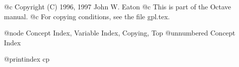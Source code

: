 @c Copyright (C) 1996, 1997 John W. Eaton
@c This is part of the Octave manual.
@c For copying conditions, see the file gpl.tex.

@node Concept Index, Variable Index, Copying, Top
@unnumbered Concept Index

@printindex cp
